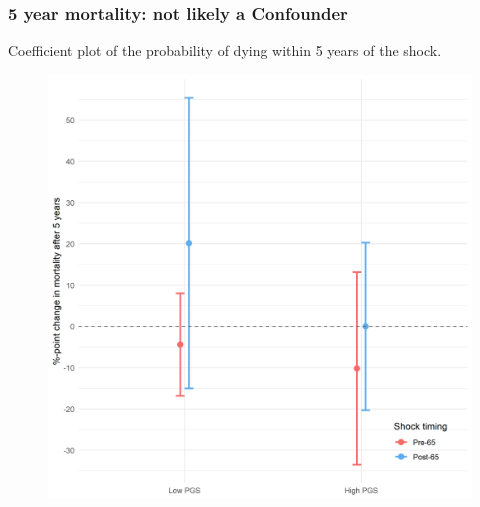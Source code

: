 \documentclass[10pt,compress,xcolor=dvipsnames,aspectratio=169]{beamer}    %
\newcounter{ex}
\newcommand{\1}[1]{\mathrm{1\hspace*{-2.5pt}l}[#1]}	%
\begin{document}
\begin{frame}
\frametitle{5 year mortality: not likely a Confounder}
Coefficient plot of the probability of dying within 5 years of the shock.
\begin{figure}[hbtp]
\centering
\includegraphics[height=0.8\textheight]{../../3_output/shock_effects/dead5_6070_100_cv.png}
\label{fig:dead5}
\end{figure}
\end{frame}





\end{document}
